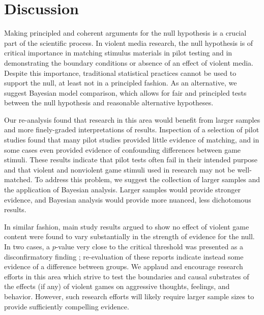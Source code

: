 \documentclass[man]{apa6}
\begin{document}
\section{Discussion} 
Making principled and coherent arguments for the null hypothesis is a crucial part of the scientific process. In violent media research, the null hypothesis is of critical importance in matching stimulus materials in pilot testing and in demonstrating the boundary conditions or absence of an effect of violent media. Despite this importance, traditional statistical practices cannot be used to support the null, at least not in a principled fashion. As an alternative, we suggest Bayesian model comparison, which allows for fair and principled tests between the null hypothesis and reasonable alternative hypotheses.

Our re-analysis found that research in this area would benefit from larger samples and more finely-graded interpretations of results. Inspection of a selection of pilot studies found that many pilot studies provided little evidence of matching, and in some cases even provided evidence of confounding differences between game stimuli. These results indicate that pilot tests often fail in their intended purpose and that violent and nonviolent game stimuli used in research may not be well-matched. To address this problem, we suggest the collection of larger samples and the application of Bayesian analysis. Larger samples would provide stronger evidence, and Bayesian analysis would provide more nuanced, less dichotomous results.

In similar fashion, main study results argued to show no effect of violent game content were found to vary substantially in the strength of evidence for the null. In two cases, a $p$-value very close to the critical threshold was presented as a disconfirmatory finding \citep{Elson:etal:2013,Valadez:Ferguson:2012}; re-evaluation of these reports indicate instead some evidence of a difference between groups. We applaud and encourage research efforts in this area which strive to test the boundaries and causal substrates of the effects (if any) of violent games on aggressive thoughts, feelings, and behavior. However, such research efforts will likely require larger sample sizes to provide sufficiently compelling evidence. 
\end{document}
